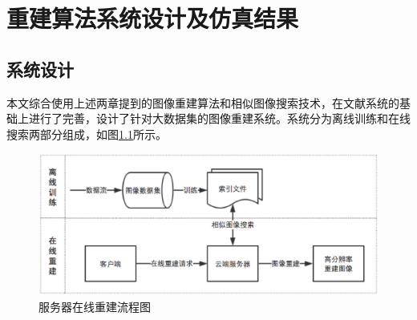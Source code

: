 \chapter{重建算法系统设计及仿真结果}

\section{系统设计}

本文综合使用上述两章提到的图像重建算法和相似图像搜索技术，在文献\cite{Yue:2013gl}系统的基础上进行了完善，设计了针对大数据集的图像重建系统。系统分为离线训练和在线搜索两部分组成，如图\ref{fig:system}所示。

\begin{figure}
\centering\includegraphics[width=15cm]{imgs/ch4/system}
\caption{服务器在线重建流程图}
\label{fig:system}
\end{figure}

